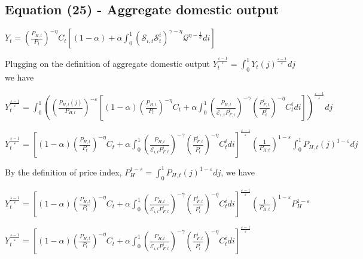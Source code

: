 \documentclass[
]{article}
\begin{document}
\vspace{12pt}

\hypertarget{equation-25---aggregate-domestic-output}{%
\subsection{Equation (25) - Aggregate domestic
output}\label{equation-25---aggregate-domestic-output}}

\(\displaystyle Y_t = \left( \frac{P_{H,t}}{P_t} \right)^{-\eta}C_t \left[ (1-\alpha) + \alpha \int_0^1 \left( \mathcal{S}_{i,t} \mathcal{S}_t^i\right)^{\gamma-\eta} \mathcal{Q}^{\eta-\frac{1}{\sigma}} di \right]\)

\vspace{8pt}

Plugging on the definition of aggregate domestic output
\(\displaystyle Y_t^{\frac{\varepsilon-1}{\varepsilon}}= \int_0^1Y_t(j)^{\frac{\varepsilon-1}{\varepsilon}}dj\)
we have

\(\displaystyle Y_t^{\frac{\varepsilon-1}{\varepsilon}} = \int_0^1 \left( \left( \frac{P_{H,t}(j)}{P_{H,t}}\right)^{-\varepsilon} \left[ (1-\alpha)\left( \frac{P_{H,t}}{P_t} \right)^{-\eta}C_t + \alpha \int_0^1 \left( \frac{P_{H,t}}{\mathcal{E}_{i,t}P_{F,t}^i}\right)^{-\gamma} \left( \frac{P_{F,t}^i}{P_t^i} \right)^{-\eta} C_t^i di \right] \right)^{\frac{\varepsilon-1}{\varepsilon}}dj\)

\(\displaystyle Y_t^{\frac{\varepsilon-1}{\varepsilon}} = \left[ (1-\alpha)\left( \frac{P_{H,t}}{P_t} \right)^{-\eta}C_t + \alpha \int_0^1 \left( \frac{P_{H,t}}{\mathcal{E}_{i,t}P_{F,t}^i}\right)^{-\gamma} \left( \frac{P_{F,t}^i}{P_t^i} \right)^{-\eta} C_t^i di \right]^{\frac{\varepsilon-1}{\varepsilon}} \left( \frac{1}{P_{H,t}}\right)^{1-\varepsilon} \int_0^1 P_{H,t}(j) ^{1-\varepsilon} dj\)

By the definition of price index,
\(\displaystyle P_H^{1-\varepsilon} = \int_0^1 P_{H,t}(j)^{1-\varepsilon}dj\),
we have

\(\displaystyle Y_t^{\frac{\varepsilon-1}{\varepsilon}} = \left[ (1-\alpha)\left( \frac{P_{H,t}}{P_t} \right)^{-\eta}C_t + \alpha \int_0^1 \left( \frac{P_{H,t}}{\mathcal{E}_{i,t}P_{F,t}^i}\right)^{-\gamma} \left( \frac{P_{F,t}^i}{P_t^i} \right)^{-\eta} C_t^i di \right]^{\frac{\varepsilon-1}{\varepsilon}} \left( \frac{1}{P_{H,t}}\right)^{1-\varepsilon} P_H^{1-\varepsilon}\)

\(\displaystyle Y_t^{\frac{\varepsilon-1}{\varepsilon}} = \left[ (1-\alpha)\left( \frac{P_{H,t}}{P_t} \right)^{-\eta}C_t + \alpha \int_0^1 \left( \frac{P_{H,t}}{\mathcal{E}_{i,t}P_{F,t}^i}\right)^{-\gamma} \left( \frac{P_{F,t}^i}{P_t^i} \right)^{-\eta} C_t^i di \right]^{\frac{\varepsilon-1}{\varepsilon}}\)
\end{document}
